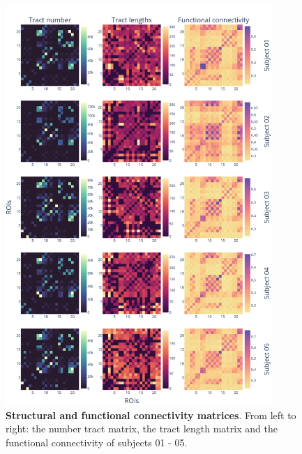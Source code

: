 \documentclass[../main.tex]{subfiles}
\begin{document}
\begin{figure}[htbp]
    \centering
    \includegraphics[width=0.90\textwidth]{chapter3/figures/empirical_matrices_0.png}
    \caption{\textbf{Structural and functional connectivity matrices}.
    From left to right: the number tract matrix, the tract length matrix and the functional connectivity of subjects 01 - 05.}
    \label{fig:matrices_data}
\end{figure}
\end{document}
